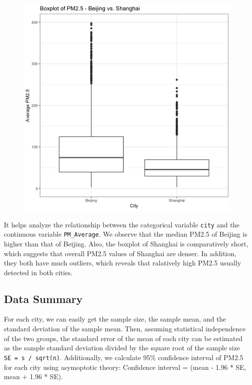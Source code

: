 \documentclass[]{article}
\begin{document}
\begin{figure}
\centering
\includegraphics{../results/boxplot.png}
\caption{}
\end{figure}

It helps analyze the relationship between the categorical variable
\texttt{city} and the continuous variable \texttt{PM\_Average}. We
observe that the median PM2.5 of Beijing is higher than that of Beijing.
Also, the boxplot of Shanghai is comparatively short, which suggests
that overall PM2.5 values of Shanghai are denser. In addition, they both
have much outliers, which reveals that ralatively high PM2.5 usually
detected in both cities.

\subsection{Data Summary}\label{data-summary}

For each city, we can easily get the sample size, the sample mean, and
the standard deviation of the sample mean. Then, assuming statistical
independence of the two groups, the standard error of the mean of each
city can be estimated as the sample standard deviation divided by the
square root of the sample size \texttt{SE\ =\ s\ /\ sqrt(n)}.
Additionally, we calculate 95\% confidence interval of PM2.5 for each
city using asymoptotic theory: Confidence interval = (mean - 1.96 * SE,
mean + 1.96 * SE).
\end{document}
